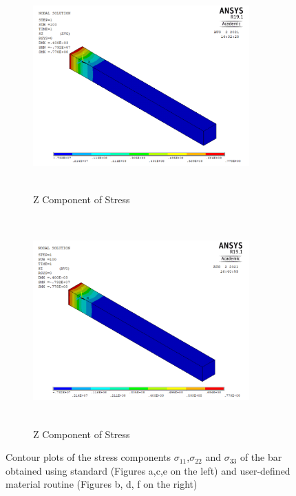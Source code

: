 \documentclass[12pt,twoside]{report}
\begin{document}
\begin{figure}[htbp!]\ContinuedFloat     
     \begin{subfigure}[b]{0.4\textwidth}
         \includegraphics[width=8.3cm,height=8cm,keepaspectratio]{17.Ansys_SZ.png}
         \caption{Z Component of Stress}
         \label{fig:Z Component of Stress}
     \end{subfigure}
     \hspace{1.8cm}
     \begin{subfigure}[b]{0.4\textwidth}
         \includegraphics[width=8.3cm,height=8cm,keepaspectratio]{20.User_SZ.png}
         \caption{Z Component of Stress}
         \label{fig:Z Component of Stress2}
     \end{subfigure}
        \caption{Contour plots of the stress components $\sigma_{11}$,$\sigma_{22}$ and $\sigma_{33}$ of the bar obtained using standard (Figures a,c,e on the left) and user-defined material routine (Figures b, d, f on the right)}
        \label{fig:USERMAT}     
\end{figure}
\FloatBarrier
\end{document}
